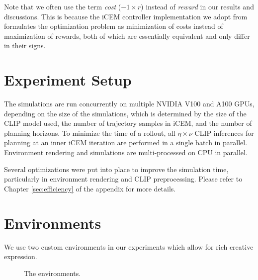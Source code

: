 Note that we often use the term \emph{cost} (\(-1 \times r\)) instead of \emph{reward} in our results and discussions. This is because the iCEM controller implementation we adopt from \citet{icem} formulates the optimization problem as minimization of costs instead of maximization of rewards, both of which are essentially equivalent and only differ in their signs.

\section{Experiment Setup}
\label{sec:experiment-setup}

The simulations are run concurrently on multiple NVIDIA V100 and A100 GPUs, depending on the size of the simulations, which is determined by the size of the CLIP model used, the number of trajectory samples in iCEM, and the number of planning horizons.
To minimize the time of a rollout, all \(\eta \times \nu\) CLIP inferences for planning at an inner iCEM iteration are performed in a single batch in parallel.
Environment rendering and simulations are multi-processed on CPU in parallel.

Several optimizations were put into place to improve the simulation time, particularly in environment rendering and CLIP preprocessing.
Please refer to Chapter \ref{sec:efficiency} of the appendix for more details.

\section{Environments}
\label{sec:environments}
We use two custom environments in our experiments which allow for rich creative expression.

\begin{figure}[H]
    \centering
    \qquad
    \caption{The environments.}
    \label{fig:environments}
\end{figure}

